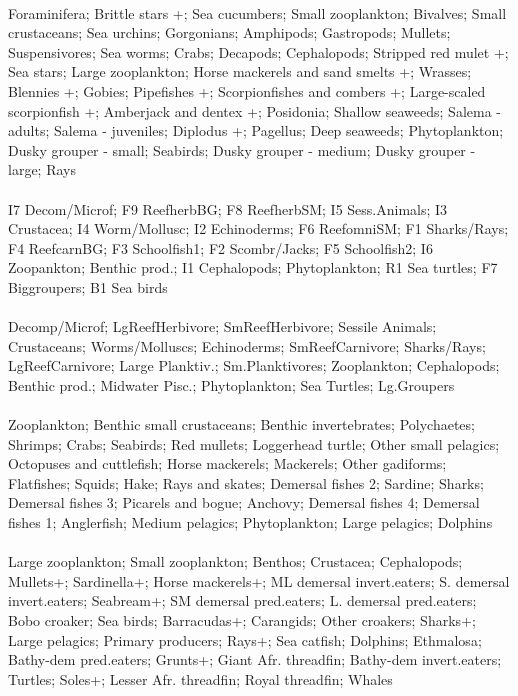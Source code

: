 \fullhline
\hline
{} \\
\hline
Foraminifera; Brittle stars +; Sea cucumbers; Small zooplankton; Bivalves; Small crustaceans; Sea urchins; Gorgonians; Amphipods; Gastropods; Mullets; Suspensivores; Sea worms; Crabs; Decapods; Cephalopods; Stripped red mulet +; Sea stars; Large zooplankton; Horse mackerels and sand smelts +; Wrasses; Blennies +; Gobies; Pipefishes +; Scorpionfishes and combers +; Large-scaled scorpionfish +; Amberjack and dentex +; Posidonia; Shallow seaweeds; Salema - adults; Salema - juveniles; Diplodus +; Pagellus; Deep seaweeds; Phytoplankton; Dusky grouper - small; Seabirds; Dusky grouper - medium; Dusky grouper - large; Rays\\
\fullhline
\hline
{} \\
\hline
I7 Decom/Microf; F9 ReefherbBG; F8 ReefherbSM; I5 Sess.Animals; I3 Crustacea; I4 Worm/Mollusc; I2 Echinoderms; F6 ReefomniSM; F1 Sharks/Rays; F4 ReefcarnBG; F3 Schoolfish1; F2 Scombr/Jacks; F5 Schoolfish2; I6 Zoopankton; Benthic prod.; I1 Cephalopods; Phytoplankton; R1 Sea turtles; F7 Biggroupers; B1 Sea birds\\
\fullhline
\hline
{} \\
\hline
Decomp/Microf; LgReefHerbivore; SmReefHerbivore; Sessile Animals; Crustaceans; Worms/Molluscs; Echinoderms; SmReefCarnivore; Sharks/Rays; LgReefCarnivore; Large Planktiv.; Sm.Planktivores; Zooplankton; Cephalopods; Benthic prod.; Midwater Pisc.; Phytoplankton; Sea Turtles; Lg.Groupers\\
\fullhline
\hline
{} \\
\hline
Zooplankton; Benthic small crustaceans; Benthic invertebrates; Polychaetes; Shrimps; Crabs; Seabirds; Red mullets; Loggerhead turtle; Other small pelagics; Octopuses and cuttlefish; Horse mackerels; Mackerels; Other gadiforms; Flatfishes; Squids; Hake; Rays and skates; Demersal fishes 2; Sardine; Sharks; Demersal fishes 3; Picarels and bogue; Anchovy; Demersal fishes 4; Demersal fishes 1; Anglerfish; Medium pelagics; Phytoplankton; Large pelagics; Dolphins\\
\fullhline
\hline
{} \\
\hline
Large zooplankton; Small zooplankton; Benthos; Crustacea; Cephalopods; Mullets+; Sardinella+; Horse mackerels+; ML demersal invert.eaters; S. demersal invert.eaters; Seabream+; SM demersal pred.eaters; L. demersal pred.eaters; Bobo croaker; Sea birds; Barracudas+; Carangids; Other croakers; Sharks+; Large pelagics; Primary producers; Rays+; Sea catfish; Dolphins; Ethmalosa; Bathy-dem pred.eaters; Grunts+; Giant Afr. threadfin; Bathy-dem invert.eaters; Turtles; Soles+; Lesser Afr. threadfin; Royal threadfin; Whales\\
